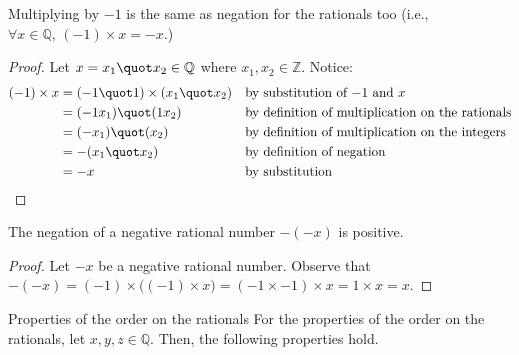 \break
\begin{lemma}\label{lem:negation_same_multiplication_negative_one}
    Multiplying by $-1$ is the same as negation for the rationals too (i.e., $\forall x \in \mathbb{Q}, \, (-1) \times x = -x$.)
\end{lemma}

\begin{proof}
    Let $x = x_1 \quot x_2 \in \mathbb{Q}$ where $x_1, x_2 \in \mathbb{Z}.$ Notice:
    \begin{align*}
        (-1) \times x &= (-1 \quot 1) \times (x_1 \quot x_2) && \text{by substitution of $-1$ and $x$}\\
        &= (-1 x_1) \quot (1 x_2) && \text{by definition of multiplication on the rationals}\\
        &= (-x_1) \quot (x_2) && \text{by definition of multiplication on the integers} \\
        &= -(x_1 \quot x_2) && \text{by definition of negation}\\
        &= -x &&\text{by substitution}
    \end{align*}
\end{proof}

\begin{lemma}\label{lem: minus_minus_positive}
    The negation of a negative rational number $-(-x)$ is positive.
\end{lemma}
\begin{proof}
    Let $-x$ be a negative rational number.
    Observe that     $-(-x) = (-1) \times \big((-1) \times x\big) = (-1 \times -1) \times x = 1 \times x = x.$
\end{proof}


\begin{problem}{Properties of the order on the rationals}
    For the properties of the order on the rationals, let $x, y, z \in \mathbb{Q}.$ 
    Then, the following properties hold.
\end{problem}

